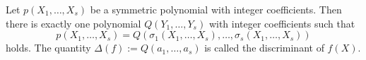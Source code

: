 Let $p(X_1, \ldots, X_s)$ be a symmetric polynomial with integer coefficients. Then there is exactly one polynomial $Q(Y_1, \ldots, Y_s)$ with integer coefficients such that
$$p(X_1, \ldots, X_s) = Q(\sigma_1(X_1, \ldots, X_s), \ldots, \sigma_s(X_1, \ldots, X_s))$$
holds. The quantity $\Delta(f) := Q(a_1, \ldots, a_s)$ is called the discriminant of $f(X)$.
